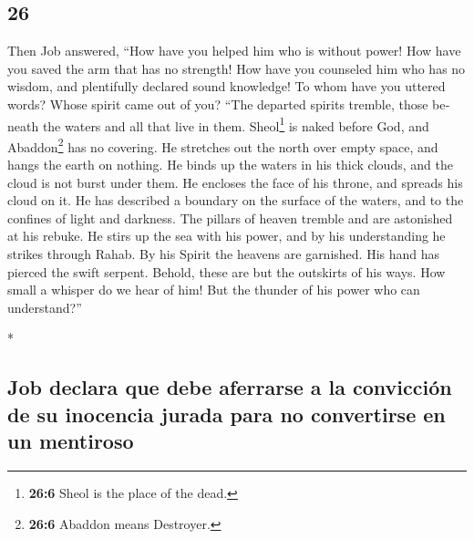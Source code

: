 \begin{paracol}{2}
\switchcolumn
\begin{otherlanguage}{english}

\hypertarget{section-51}{%
\section{26}\label{section-51}}

 Then Job answered,  ``How have you helped
him who is without power! How have you saved the arm that has no
strength!  How have you counseled him who has no wisdom,
and plentifully declared sound knowledge!  To whom have
you uttered words? Whose spirit came out of you?  ``The
departed spirits tremble, those beneath the waters and all that live in
them.  Sheol\footnote{\textbf{26:6} Sheol is the place of
  the dead.} is naked before God, and Abaddon\footnote{\textbf{26:6}
  Abaddon means Destroyer.} has no covering.  He stretches
out the north over empty space, and hangs the earth on nothing.
 He binds up the waters in his thick clouds, and the cloud
is not burst under them.  He encloses the face of his
throne, and spreads his cloud on it.  He has described a
boundary on the surface of the waters, and to the confines of light and
darkness.  The pillars of heaven tremble and are
astonished at his rebuke.  He stirs up the sea with his
power, and by his understanding he strikes through Rahab.
 By his Spirit the heavens are garnished. His hand has
pierced the swift serpent.  Behold, these are but the
outskirts of his ways. How small a whisper do we hear of him! But the
thunder of his power who can understand?''

\end{otherlanguage}

\switchcolumn[0]*

\hypertarget{job-declara-que-debe-aferrarse-a-la-convicciuxf3n-de-su-inocencia-jurada-para-no-convertirse-en-un-mentiroso}{%
\subsection{Job declara que debe aferrarse a la convicción de su
inocencia jurada para no convertirse en un
mentiroso}\label{job-declara-que-debe-aferrarse-a-la-convicciuxf3n-de-su-inocencia-jurada-para-no-convertirse-en-un-mentiroso}}

\hypertarget{section-52}{%
}
\end{paracol}
